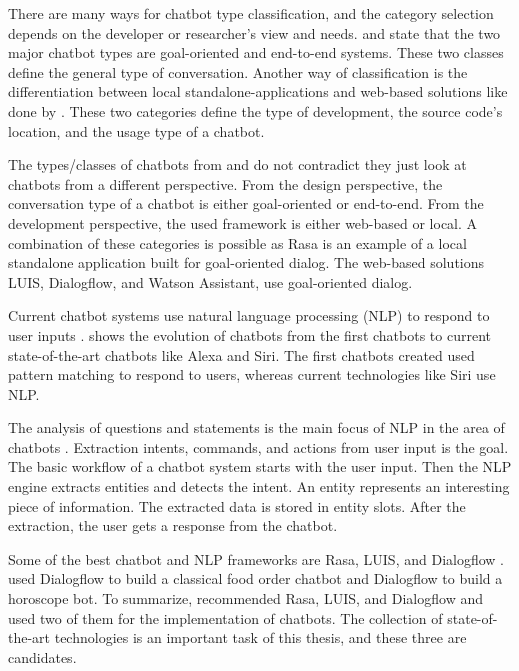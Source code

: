 There are many ways for chatbot type classification, and the category selection depends on the developer or researcher's view and needs.
\citet{williams2017hybrid} and \citet{bordes2016learning} state that the two major chatbot types are goal-oriented and end-to-end systems.
These two classes define the general type of conversation.
Another way of classification is the differentiation between local standalone-applications and web-based solutions like done by \citet{kane2016role}.
These two categories define the type of development, the source code's location, and the usage type of a chatbot.

The types/classes of chatbots from \citet{williams2017hybrid, bordes2016learning} and \citet{kane2016role} do not contradict they just look at chatbots from a different perspective.
From the design perspective, the conversation type of a chatbot is either goal-oriented or end-to-end.
From the development perspective, the used framework is either web-based or local.
A combination of these categories is possible as Rasa is an example of a local standalone application built for goal-oriented dialog.
The web-based solutions LUIS, Dialogflow, and Watson Assistant, use goal-oriented dialog.

Current chatbot systems use natural language processing (NLP) to respond to user inputs \cite{deshpande2017survey}.
\citet{deshpande2017survey} shows the evolution of chatbots from the first chatbots to current state-of-the-art chatbots like Alexa and Siri.
The first chatbots created used pattern matching to respond to users, whereas current technologies like Siri use NLP.

The analysis of questions and statements is the main focus of NLP in the area of chatbots \cite{deshpande2017survey}.
Extraction intents, commands, and actions from user input is the goal.
The basic workflow of a chatbot system starts with the user input. 
Then the NLP engine extracts entities and detects the intent.
An entity represents an interesting piece of information.
The extracted data is stored in entity slots.
After the extraction, the user gets a response from the chatbot.

Some of the best chatbot and NLP frameworks are Rasa, LUIS, and Dialogflow \cite{buiildChatbotsPython}.
\citet{buiildChatbotsPython} used Dialogflow to build a classical food order chatbot and Dialogflow to build a horoscope bot.
To summarize, \citet{buiildChatbotsPython} recommended Rasa, LUIS, and Dialogflow and used two of them for the implementation of chatbots.
The collection of state-of-the-art technologies is an important task of this thesis, and these three are candidates.

